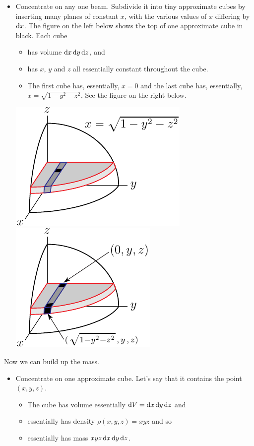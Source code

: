 \begin{eg}
\begin{itemize}
\item 
Concentrate on any one beam. Subdivide it into tiny approximate cubes
by inserting many planes of constant $x$, with the various values of $x$ differing by $\mathrm{d}x$. The figure on the left below shows the top of one 
approximate cube in black. Each cube 
\vspace{-\topsep}
\begin{itemize} \itemsep1pt \parskip0pt 
\item
has volume $\mathrm{d}x\,\mathrm{d}y\,\mathrm{d}z$, and 
\item
has $x$, $y$ and $z$ all essentially constant throughout the cube.
\item The first cube has, essentially, $x=0$ and the last cube has,
essentially, $x=\sqrt{1-y^2-z^2}$.  See the figure on the right below.
\end{itemize}
\vspace{-\topsep}
\begin{efig}
\begin{center}
    \includegraphics{sphereMass3.pdf}\qquad
    \includegraphics{sphereMass3a.pdf}
\end{center}
\end{efig}
\end{itemize}

Now we can build up the mass.
\begin{itemize}
\item
Concentrate on one approximate cube. Let's say that it contains the point 
$(x,y,z)$.
\begin{itemize}
\item 
The cube has volume essentially $\mathrm{d}V =  \mathrm{d}x\,\mathrm{d}y\,\mathrm{d}z$
and
\item
essentially has density $\rho(x,y,z) = xyz$ and so
\item 
essentially has mass $xyz\,\mathrm{d}x\,\mathrm{d}y\,\mathrm{d}z$.
\end{itemize}


\end{itemize}
\end{eg}
